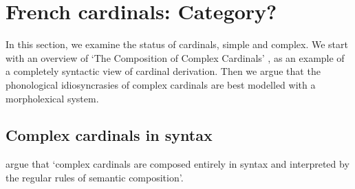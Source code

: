 \documentclass[output=paper]{langsci/langscibook}
\begin{document}





\section{French cardinals: Category?}\label{cardCat}\label{Sec2}
In this section, we examine the status of  cardinals, simple and complex. We start with an overview of `The Composition of Complex Cardinals' \citep{IM06}, as an example of a completely syntactic view of cardinal derivation. Then we argue that the phonological idiosyncrasies of complex cardinals  are best modelled with a morpholexical system.

\subsection{Complex cardinals in syntax}

\cite[316]{IM06} argue that `complex cardinals  are composed entirely in syntax and interpreted by the regular rules of semantic composition'.
\end{document}
